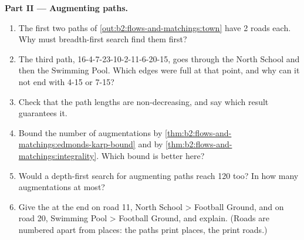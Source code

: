 \begin{problem}
\medskip\noindent\textbf{Part II --- Augmenting paths.}\par\nopagebreak
\begin{enumerate}[resume, beginpenalty=10000]
\item The first two paths of \cref{out:b2:flows-and-matchings:town} have 2 roads each. Why must breadth-first search
find them first?
\item The third path, 16-4-7-23-10-2-11-6-20-15, goes through the North School and then the Swimming Pool. Which edges
were full at that point, and why can it not end with 4-15 or 7-15?
\item Check that the path lengths are non-decreasing, and say which result guarantees it.
\item Bound the number of augmentations by \cref{thm:b2:flows-and-matchings:edmonds-karp-bound} and by
\cref{thm:b2:flows-and-matchings:integrality}. Which bound is better here?
\item Would a depth-first search for augmenting paths reach 120 too? In how many augmentations at most?
\item Give the  at the end on road 11, North School > Football Ground, and on road 20, Swimming Pool >
Football Ground, and explain. (Roads are numbered apart from places: the paths print places, the  print roads.)
\end{enumerate}


\end{problem}
